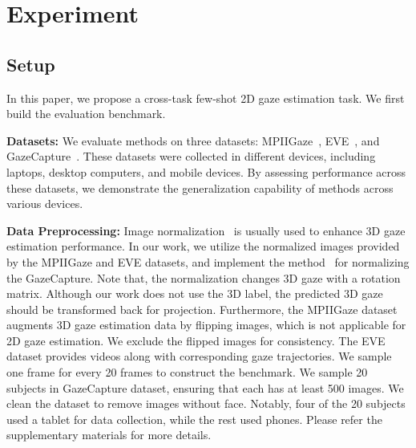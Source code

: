 
\section{Experiment}

\subsection{Setup}
In this paper, we propose a cross-task few-shot 2D gaze estimation task. We first build the evaluation benchmark.

\noindent\textbf{Datasets:} We evaluate methods on three datasets: MPIIGaze~\cite{Zhang_2017_CVPRW}, EVE~\cite{park_2020_eccv}, and GazeCapture~\cite{Krafka_2016_CVPR}. These datasets were collected in different devices, including laptops, desktop computers, and mobile devices. By assessing performance across these datasets, we demonstrate the generalization capability of methods across various devices.

\noindent\textbf{Data Preprocessing:}
Image normalization~\cite{Cheng_2024_pami} is usually used to enhance 3D gaze estimation performance.  In our work, we utilize the normalized images provided by the MPIIGaze and EVE datasets, and implement the method~\cite{Zhang_2018_etra} for normalizing the GazeCapture. Note that, the normalization changes 3D gaze with a rotation matrix.
Although our work does not use the 3D label, the predicted 3D gaze should be transformed back for projection.
Furthermore, the MPIIGaze dataset augments 3D gaze estimation data by flipping images, which is not applicable for 2D gaze estimation. We exclude the flipped images for consistency.
The EVE dataset provides videos along with corresponding gaze trajectories. We  sample one frame for every 20 frames to construct the benchmark.
We sample 20 subjects in GazeCapture dataset, ensuring that each has at least 500 images. We clean the dataset to remove images without face. Notably, four of the 20 subjects used a tablet for data collection, while the rest used phones.
Please refer the supplementary materials for more details.


